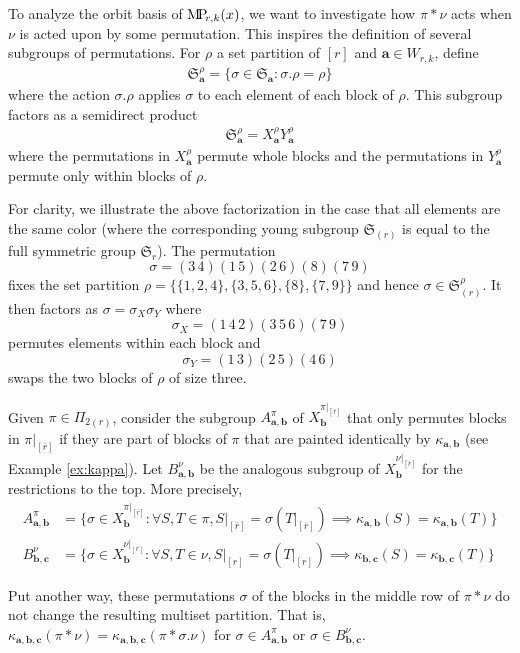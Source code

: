 \documentclass[ALCO,Unicode,published]{cedram}
\newcommand{\SG}{\mathfrak{S}}
\newcommand{\bfa}{{\boldsymbol{a}}}
\newcommand{\bfb}{{\boldsymbol{b}}}
\newcommand{\bfc}{{\boldsymbol{c}}}
\newcommand{\MP}{{\rm M\!P\!}}
\newcommand{\ov}[1]{\bar{#1}}
\newcommand{\ovb}[1]{\left[\ov{#1}\right]}
\begin{document}
To analyze the orbit basis of $\MP_{r,k}(x)$, we want to investigate how $\pi\ast\nu$ acts when $\nu$ is acted upon by some permutation. This inspires the definition of several subgroups of permutations. For $\rho$ a set partition of $[r]$ and $\bfa\in W_{r,k}$, define \begin{align*}
    \SG_\bfa^\rho=\{\sigma\in\SG_\bfa:\sigma.\rho=\rho\}
\end{align*} where the action $\sigma.\rho$ applies $\sigma$ to each element of each block of $\rho$. This subgroup factors as a semidirect product \begin{align*}
    \SG_\bfa^\rho=X_\bfa^\rho Y_\bfa^\rho
\end{align*} where the permutations in $X_\bfa^\rho$ permute whole blocks and the permutations in $Y_\bfa^\rho$ permute only within blocks of $\rho$.

\begin{exam} For clarity, we illustrate the above factorization in the case that all elements are the same color (where the corresponding young subgroup $\SG_{(r)}$ is equal to the full symmetric group $\SG_r$). The permutation \[\sigma=(3\,4)(1\,5)(2\,6)(8)(7\,9)\] fixes the set partition $\rho=\{\{1,2,4\},\{3,5,6\},\{8\},\{7,9\}\}$ and hence $\sigma\in \SG_{(r)}^\rho$. It then factors as $\sigma=\sigma_X\sigma_Y$ where \[\sigma_X=(1\,4\,2)(3\,5\,6)(7\,9)\] permutes elements within each block and \[\sigma_Y=(1\,3)(2\,5)(4\,6)\] swaps the two blocks of $\rho$ of size three. 
\end{exam}

Given $\pi\in\Pi_{2(r)}$, consider the subgroup $A_{\bfa,\bfb}^\pi$ of $X_\bfb^{\pi|_{\ovb{r}}}$ that only permutes blocks in $\pi|_{\ovb{r}}$ if they are part of blocks of $\pi$ that are painted identically by $\kappa_{\bfa,\bfb}$ (see Example \ref{ex:kappa}). Let $B_{\bfa,\bfb}^\nu$ be the analogous subgroup of $X_\bfb^{\nu|_{\ovb{r}}}$ for the restrictions to the top. More precisely,
\begin{align*}
    A^\pi_{\bfa,\bfb}&=\{\sigma\in X_\bfb^{\pi|_{\ovb{r}}}:\forall S,T\in\pi, S|_{\ovb{r}}=\sigma(T|_{\ovb{r}})\implies \kappa_{\bfa,\bfb}(S)=\kappa_{\bfa,\bfb}(T)\}\\
    B^\nu_{\bfb,\bfc}&=\{\sigma\in X_\bfb^{\nu|_{[r]}}:\forall S,T\in\nu, S|_{[r]}=\sigma(T|_{[r]})\implies \kappa_{\bfb,\bfc}(S)=\kappa_{\bfb,\bfc}(T)\}
\end{align*}

Put another way, these permutations $\sigma$ of the blocks in the middle row of $\pi\ast\nu$ do not change the resulting multiset partition. That is, $\kappa_{\bfa,\bfb,\bfc}(\pi\ast\nu)=\kappa_{\bfa,\bfb,\bfc}(\pi\ast\sigma.\nu)$ for $\sigma\in A_{\bfa,\bfb}^\pi$ or $\sigma\in B_{\bfb,\bfc}^\nu$.
\end{document}
